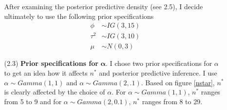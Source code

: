 \documentclass[a4paper, 10pt]{article}
\newcommand{\nstar}{n^*}
\newcommand{\tausq}{\tau^2}
\begin{document}
\begin{enumerate}
\begin{enumerate}
    After examining the posterior predictive density (see 2.5), I decide ultimately to use the following prior specifications
    \begin{align*}
        \phi &\sim IG(3,15)\\
        \tausq &\sim IG(3,10)\\
        \mu &\sim N(0,3)
    \end{align*}
    \item[(2.3)] \textbf{Prior specifications for} $\pmb{\alpha}$. I chose two prior specifications for $\alpha$ to get an idea how it affects $\nstar$ and posterior predictive inference. I use $\alpha \sim Gamma(1,1)$ and $\alpha \sim Gamma(2,.1)$. Based on figure \ref{nstar}, $\nstar$ is clearly affected by the choice of $\alpha$. For $\alpha \sim Gamma(1,1)$, $\nstar$ ranges from 5 to 9 and for $\alpha \sim Gamma(2,0.1)$, $\nstar$ ranges from 8 to 29.
    \begin{figure}[h!]
        \centering

\end{figure}
\end{enumerate}
\end{enumerate}
\end{document}

